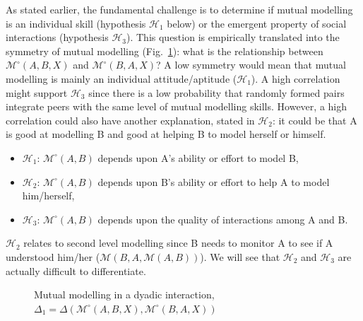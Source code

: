 \documentclass[natbib]{svjour3}
\newcommand{\A}{A\xspace}
\newcommand{\B}{B\xspace}
\newcommand{\Model}[3]{{$\mathcal{M}^{\circ}(#1, #2, #3)$}}
\begin{document}
As stated earlier, the fundamental challenge is to determine if mutual modelling
is an individual skill (hypothesis $\mathcal{H}_{1}$ below) or  the emergent
property of social interactions (hypothesis $\mathcal{H}_{3}$).  This question
is empirically translated into the symmetry of mutual modelling
(Fig.~\ref{mm_symmetry}): what is the relationship between \Model{A}{B}{X} and
\Model{B}{A}{X}? A low symmetry would mean that mutual modelling is mainly an
individual attitude/aptitude ($\mathcal{H}_{1}$).  A high correlation might
support $\mathcal{H}_{3}$ since there is a low probability that randomly formed
pairs integrate peers with the same level of mutual modelling skills. However, a
high correlation could also have another explanation, stated in
$\mathcal{H}_{2}$: it could be that \A is good at modelling \B and good at
helping \B to model herself or himself.


\begin{itemize}
    \item $\mathcal{H}_{1}$: $\mathcal{M}^{\circ}(A,B)$ depends upon \A's ability or effort
        to model \B,
    
    \item $\mathcal{H}_{2}$: $\mathcal{M}^{\circ}(A,B)$ depends upon  \B's ability or
        effort to help \A to model him/herself,

    \item $\mathcal{H}_{3}$: $\mathcal{M}^{\circ}(A,B)$ depends upon the quality of
        interactions among \A and \B.

\end{itemize}


$\mathcal{H}_{2}$ relates to second level modelling since \B needs to monitor
\A to see if \A understood him/her ($\mathcal{M}(B,A,\mathcal{M}(A,B))$). We
will see that $\mathcal{H}_{2}$ and $\mathcal{H}_{3}$ are actually difficult to
differentiate.



\begin{figure}[htb]
\centering


\caption{\small Mutual modelling in a dyadic interaction, $\Delta_1 =
    \Delta(\mathcal{M}^{\circ} (A,B,X),
\mathcal{M}^{\circ} (B,A,X))$}

\label{mm_symmetry}
\end{figure}
\end{document}

